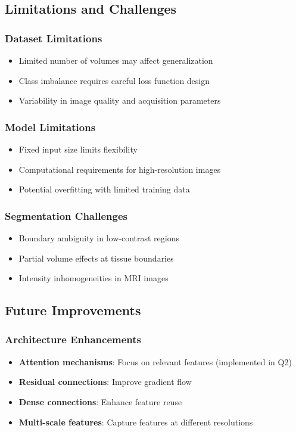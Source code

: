 \documentclass[12pt,a4paper]{article}
\begin{document}
\subsection{Limitations and Challenges}

\subsubsection{Dataset Limitations}
\begin{itemize}
    \item Limited number of volumes may affect generalization
    \item Class imbalance requires careful loss function design
    \item Variability in image quality and acquisition parameters
\end{itemize}

\subsubsection{Model Limitations}
\begin{itemize}
    \item Fixed input size limits flexibility
    \item Computational requirements for high-resolution images
    \item Potential overfitting with limited training data
\end{itemize}

\subsubsection{Segmentation Challenges}
\begin{itemize}
    \item Boundary ambiguity in low-contrast regions
    \item Partial volume effects at tissue boundaries
    \item Intensity inhomogeneities in MRI images
\end{itemize}

\subsection{Future Improvements}

\subsubsection{Architecture Enhancements}
\begin{itemize}
    \item \textbf{Attention mechanisms}: Focus on relevant features (implemented in Q2)
    \item \textbf{Residual connections}: Improve gradient flow
    \item \textbf{Dense connections}: Enhance feature reuse
    \item \textbf{Multi-scale features}: Capture features at different resolutions
\end{itemize}
\end{document}
